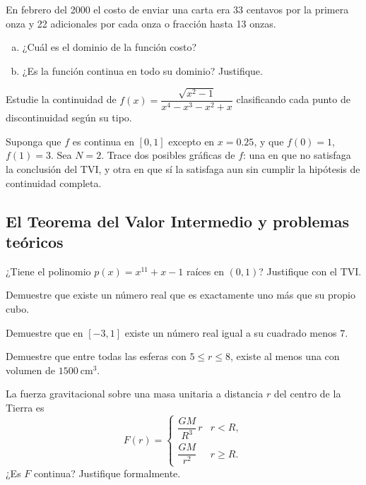 \begin{prob}
En febrero del 2000 el costo de enviar una carta era 33 centavos por la
primera onza y 22 adicionales por cada onza o fracción hasta 13 onzas.
\begin{enumerate}[a)]
    \item ¿Cuál es el dominio de la función costo?
    \item ¿Es la función continua en todo su dominio? Justifique.
\end{enumerate}
\end{prob}

\begin{prob}
Estudie la continuidad de
$f(x)=\dfrac{\sqrt{x^2-1}}{x^4-x^3-x^2+x}$
clasificando cada punto de discontinuidad según su tipo.
\end{prob}

\begin{prob}
Suponga que $f$ es continua en $[0,1]$ excepto en $x=0.25$, y que
$f(0)=1$, $f(1)=3$. Sea $N=2$. Trace dos posibles gráficas de $f$: una
en que no satisfaga la conclusión del TVI, y otra en que sí la satisfaga
aun sin cumplir la hipótesis de continuidad completa.
\end{prob}

\subsection{El Teorema del Valor Intermedio y problemas teóricos}

\begin{prob}
¿Tiene el polinomio $p(x)=x^{11}+x-1$ raíces en $(0,1)$? Justifique
con el TVI.
\end{prob}

\begin{prob}
Demuestre que existe un número real que es exactamente uno más que su
propio cubo.
\end{prob}

\begin{prob}
Demuestre que en $[-3,1]$ existe un número real igual a su cuadrado
menos $7$.
\end{prob}

\begin{prob}
Demuestre que entre todas las esferas con $5\leq r\leq 8$, existe al
menos una con volumen de $1500~\text{cm}^3$.
\end{prob}

\begin{prob}
La fuerza gravitacional sobre una masa unitaria a distancia $r$ del
centro de la Tierra es
\[
F(r)=
\begin{cases}
\dfrac{GM}{R^3}\,r & r<R,\\[6pt]
\dfrac{GM}{r^2} & r\geq R.
\end{cases}
\]
¿Es $F$ continua? Justifique formalmente.
\end{prob}

